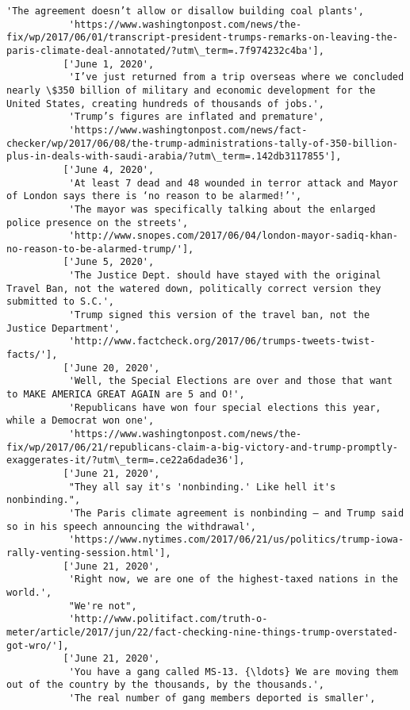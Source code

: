 \documentclass[11pt]{article}
\begin{document}
\begin{Verbatim}[commandchars=\\\{\}]
           'The agreement doesn’t allow or disallow building coal plants',
           'https://www.washingtonpost.com/news/the-fix/wp/2017/06/01/transcript-president-trumps-remarks-on-leaving-the-paris-climate-deal-annotated/?utm\_term=.7f974232c4ba'],
          ['June 1, 2020',
           'I’ve just returned from a trip overseas where we concluded nearly \$350 billion of military and economic development for the United States, creating hundreds of thousands of jobs.',
           'Trump’s figures are inflated and premature',
           'https://www.washingtonpost.com/news/fact-checker/wp/2017/06/08/the-trump-administrations-tally-of-350-billion-plus-in-deals-with-saudi-arabia/?utm\_term=.142db3117855'],
          ['June 4, 2020',
           'At least 7 dead and 48 wounded in terror attack and Mayor of London says there is ‘no reason to be alarmed!’',
           'The mayor was specifically talking about the enlarged police presence on the streets',
           'http://www.snopes.com/2017/06/04/london-mayor-sadiq-khan-no-reason-to-be-alarmed-trump/'],
          ['June 5, 2020',
           'The Justice Dept. should have stayed with the original Travel Ban, not the watered down, politically correct version they submitted to S.C.',
           'Trump signed this version of the travel ban, not the Justice Department',
           'http://www.factcheck.org/2017/06/trumps-tweets-twist-facts/'],
          ['June 20, 2020',
           'Well, the Special Elections are over and those that want to MAKE AMERICA GREAT AGAIN are 5 and O!',
           'Republicans have won four special elections this year, while a Democrat won one',
           'https://www.washingtonpost.com/news/the-fix/wp/2017/06/21/republicans-claim-a-big-victory-and-trump-promptly-exaggerates-it/?utm\_term=.ce22a6dade36'],
          ['June 21, 2020',
           "They all say it's 'nonbinding.' Like hell it's nonbinding.",
           'The Paris climate agreement is nonbinding — and Trump said so in his speech announcing the withdrawal',
           'https://www.nytimes.com/2017/06/21/us/politics/trump-iowa-rally-venting-session.html'],
          ['June 21, 2020',
           'Right now, we are one of the highest-taxed nations in the world.',
           "We're not",
           'http://www.politifact.com/truth-o-meter/article/2017/jun/22/fact-checking-nine-things-trump-overstated-got-wro/'],
          ['June 21, 2020',
           'You have a gang called MS-13. {\ldots} We are moving them out of the country by the thousands, by the thousands.',
           'The real number of gang members deported is smaller',

\end{Verbatim}
\end{document}
